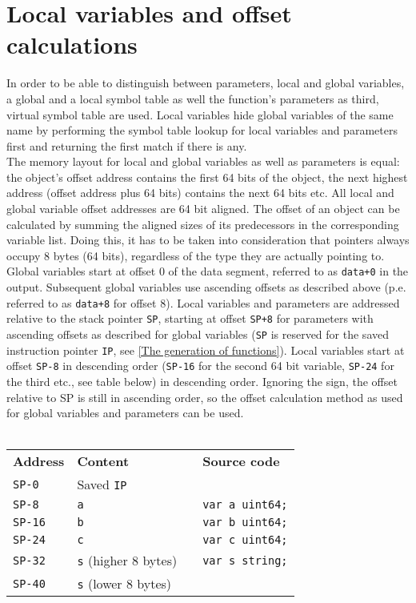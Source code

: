 \documentclass[a4paper]{scrreprt}
\begin{document}
    \section{Local variables and offset calculations}
      In order to be able to distinguish between parameters, local and global variables, a global and a local symbol table as well the function's parameters as third, virtual symbol table are used. Local variables hide global variables of the same name by performing the symbol table lookup for local variables and parameters first and returning the first match if there is any.\\
      The memory layout for local and global variables as well as parameters is equal: the object's offset address contains the first 64 bits of the object, the next highest address (offset address plus 64 bits) contains the next 64 bits etc. All local and global variable offset addresses are 64 bit aligned. The offset of an object can be calculated by summing the aligned sizes of its predecessors in the corresponding variable list. Doing this, it has to be taken into consideration that pointers always occupy 8 bytes (64 bits), regardless of the type they are actually pointing to.\\
      Global variables start at offset 0 of the data segment, referred to as \texttt{data+0} in the output. Subsequent global variables use ascending offsets as described above (p.e. referred to as \texttt{data+8} for offset 8). Local variables and parameters are addressed relative to the stack pointer \texttt{SP}, starting at offset \texttt{SP+8} for parameters with ascending offsets as described for global variables (\texttt{SP} is reserved for the saved instruction pointer \texttt{IP}, see \ref{The generation of functions}). Local variables start at offset \texttt{SP-8} in descending order (\texttt{SP-16} for the second 64 bit variable, \texttt{SP-24} for the third etc., see table below) in descending order. Ignoring the sign, the offset relative to SP is still in ascending order, so the offset calculation method as used for global variables and parameters can be used.\\ \\
      \begin{tabular}{|l|l|p{2cm}l}
        \cline{1-2}
        \textbf{Address} & \textbf{Content} & & \textbf{Source code}\\ \cline{1-2}
        \texttt{SP-0} & Saved \texttt{IP} & & \\ \cline{1-2}
        \texttt{SP-8} & \texttt{a} & & \texttt{var a uint64;}\\ \cline{1-2}
        \texttt{SP-16} & \texttt{b} & & \texttt{var b uint64;}\\ \cline{1-2}
        \texttt{SP-24} & \texttt{c} & & \texttt{var c uint64;}\\ \cline{1-2}
        \texttt{SP-32} & \texttt{s} (higher 8 bytes) & & \texttt{var s string;}\\ \cline{1-2}
        \texttt{SP-40} & \texttt{s} (lower 8 bytes) & & \\ \cline{1-2}
      \end{tabular}\\ \\
\end{document}
